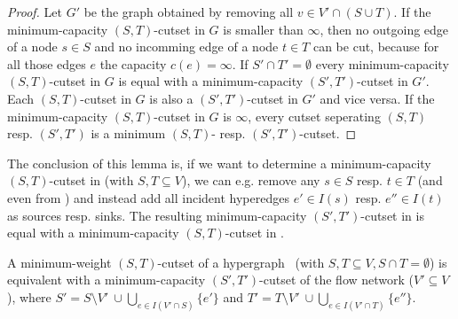 \begin{proof}
Let $G'$ be the graph obtained by removing all $v \in V' \cap (S \cup T)$. If
the minimum-capacity $(S,T)$-cutset in $G$ is smaller than $\infty$, then no outgoing
edge of a node $s \in S$ and no incomming edge of a node $t \in T$ can be cut, because for all
those edges $e$ the capacity $c(e) = \infty$. If $S' \cap T' = \emptyset$ every
minimum-capacity $(S,T)$-cutset in $G$ is equal with a minimum-capacity $(S',T')$-cutset
in $G'$. 
Each $(S,T)$-cutset in $G$ is also a $(S',T')$-cutset in $G'$ and vice versa.
If the minimum-capacity $(S,T)$-cutset in $G$ is $\infty$, every cutset seperating
$(S,T)$ resp. $(S',T')$ is a minimum $(S,T)$- resp. $(S',T')$-cutset.
\end{proof}

The conclusion of this lemma is, if we want to determine a minimum-capacity $(S,T)$-cutset
in  (with $S,T \subseteq V$), we can e.g. remove any $s \in S$ resp. $t \in T$ 
(and even from ) and instead add all incident 
hyperedges $e' \in I(s)$ resp. $e'' \in I(t)$ as sources resp. sinks. The resulting 
minimum-capacity $(S',T')$-cutset in  is equal with a minimum-capacity $(S,T)$-cutset
in . 

\begin{theorem}
\label{theorem:st_cutset_equal}
A minimum-weight $(S,T)$-cutset of a hypergraph \HypergraphDef~(with $S,T \subseteq V,
S \cap T = \emptyset$) is equivalent with a minimum-capacity $(S',T')$-cutset of the
flow network  ($V' \subseteq V$), where $S' = S \setminus V'\ \cup \bigcup\limits_{e \in I(V' \cap S)} \{e'\}$ and 
$T' = T \setminus V'\ \cup \bigcup\limits_{e \in I(V'\cap T)} \{e''\}$.
\label{theorem:heuer_network}
\end{theorem}

